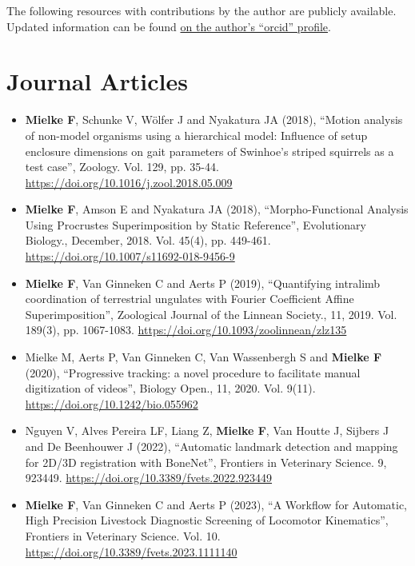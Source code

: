 \begin{change}
The following resources with contributions by the author are publicly available.
Updated information can be found \href{https://orcid.org/0000-0003-3229-0981}{on the author's ``orcid'' profile}.
\section{Journal Articles}
\label{sec:org13f3640}

\begin{itemize}
\item \textbf{Mielke F}, Schunke V, Wölfer J and Nyakatura JA (2018), ``Motion analysis of non-model organisms using a hierarchical model: Influence of setup enclosure dimensions on gait parameters of Swinhoe’s striped squirrels as a test case'', Zoology. Vol. 129, pp. 35-44. \url{https://doi.org/10.1016/j.zool.2018.05.009}

\item \textbf{Mielke F}, Amson E and Nyakatura JA (2018), ``Morpho-Functional Analysis Using Procrustes Superimposition by Static Reference'', Evolutionary Biology., December, 2018. Vol. 45(4), pp. 449-461. \url{https://doi.org/10.1007/s11692-018-9456-9}

\item \textbf{Mielke F}, Van Ginneken C and Aerts P (2019), ``Quantifying intralimb coordination of terrestrial ungulates with Fourier Coefficient Affine Superimposition'', Zoological Journal of the Linnean Society., 11, 2019. Vol. 189(3), pp. 1067-1083. \url{https://doi.org/10.1093/zoolinnean/zlz135}

\item Mielke M, Aerts P, Van Ginneken C, Van Wassenbergh S and \textbf{Mielke F} (2020), ``Progressive tracking: a novel procedure to facilitate manual digitization of videos'', Biology Open., 11, 2020. Vol. 9(11). \url{https://doi.org/10.1242/bio.055962}

\item Nguyen V, Alves Pereira LF, Liang Z, \textbf{Mielke F}, Van Houtte J, Sijbers J and De Beenhouwer J (2022), ``Automatic landmark detection and mapping for 2D/3D registration with BoneNet'', Frontiers in Veterinary Science. 9, 923449. \url{https://doi.org/10.3389/fvets.2022.923449}

\item \textbf{Mielke F}, Van Ginneken C and Aerts P (2023), ``A Workflow for Automatic, High Precision Livestock Diagnostic Screening of Locomotor Kinematics'', Frontiers in Veterinary Science. Vol. 10. \url{https://doi.org/10.3389/fvets.2023.1111140}


\end{itemize}
\end{change}
